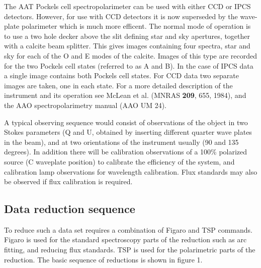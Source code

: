 The AAT Pockels cell spectropolarimeter can be used with either CCD or IPCS
detectors. However, for use with CCD detectors it is now superseded by the
wave-plate polarimeter which is much more efficent.
The normal mode of operation is to use a two hole decker above
the slit defining star and sky apertures, together with a calcite beam
splitter. This gives images containing four spectra, star and sky for each
of the O and E modes of the calcite. Images of this type are recorded for
the two Pockels cell states (referred to as A and B). In the case of IPCS data
a single image contains both Pockels cell states. For CCD data two separate
images are taken, one in each state. For a more detailed description of
the instrument and its operation see McLean et al. (MNRAS {\bf 209}, 655,
1984), and the AAO spectropolarimetry manual (AAO UM 24).

A typical observing sequence would consist of observations of the
object in two Stokes parameters (Q and U, obtained by inserting different
quarter wave plates in the beam), and at two orientations of the instrument
usually (90 and 135 degrees). In addition there will be calibration
observations of a 100\% polarized source (C waveplate position) to calibrate
the efficiency of the system, and calibration lamp observations for wavelength
calibration. Flux standards may also be observed if flux calibration is
required.

\subsection{Data reduction sequence}

To reduce such a data set requires a combination of Figaro and TSP commands.
Figaro is used for the standard spectroscopy parts of the reduction such as
arc fitting, and reducing flux standards. TSP is used for the polarimetric
parts of the reduction. The basic sequence of reductions is shown in figure 1.

